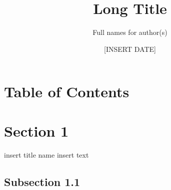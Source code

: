 \documentclass{beamer}
\title[Short title]{Long Title}
\author[Short name list for author(s)]{Full names for author(s)}
\institute[UW -- Madison, (indicate your department if desired)]{University of Wisconsin -- Madison \\ Department of [INSERT]}
\date{[INSERT DATE]} %
\begin{document}
  
\let\oldfootnotesize\footnotesize
\renewcommand*{\footnotesize}{\oldfootnotesize\tiny}

\newcommand\blfootnote[1]{%
  \begingroup
  \renewcommand\thefootnote{}\footnote{#1}%
  \addtocounter{footnote}{-1}%
  \endgroup
}

 

 

\frame{\titlepage}

\section*{Table of Contents} %
\frame {
  \frametitle{\secname} %
  \tableofcontents
}



\section{Section 1}


\begin{frame}{insert title name} 
\centering insert text
\end{frame}


\subsection{Subsection 1.1}


  
\end{document}
